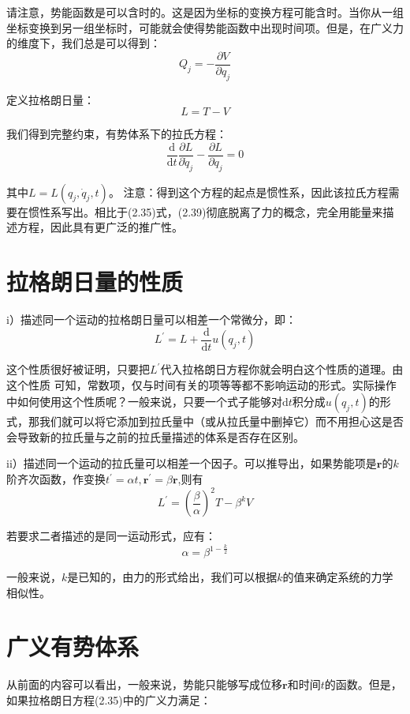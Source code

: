 \documentclass[a4paper, 10pt, openany]{book}%
\begin{document}
    请注意，势能函数是可以含时的。这是因为坐标的变换方程可能含时。当你从一组坐标变换到另一组坐标时，可能就会使得势能函数中出现时间项。但是，在广义力的维度下，我们总是可以得到：
    \begin{equation}Q_j=-\frac{\partial V}{\partial q_j}\end{equation}
    
    定义拉格朗日量：
    $$L=T-V$$
    
    我们得到完整约束，有势体系下的拉氏方程：
    \begin{equation}
      \frac{\mathrm{d}}{\mathrm{d}t}\frac{\partial L}{\partial \dot{q}_j}-\frac{\partial L}{\partial q_j}=0
    \end{equation}

    其中$L=L(q_j,\dot{q}_j,t)$。
    注意：得到这个方程的起点是惯性系，因此该拉氏方程需要在惯性系写出。相比于(2.35)式，(2.39)彻底脱离了力的概念，完全用能量来描述方程，因此具有更广泛的推广性。
    \section{拉格朗日量的性质}
    i）描述同一个运动的拉格朗日量可以相差一个常微分，即：
    \begin{equation}
      L^{\prime}=L+\frac{\mathrm{d}}{\mathrm{d}t}u(q_j,t)
    \end{equation}

    这个性质很好被证明，只要把$L^\prime$代入拉格朗日方程你就会明白这个性质的道理。由这个性质
    可知，常数项，仅与时间有关的项等等都不影响运动的形式。实际操作中如何使用这个性质呢？一般来说，只要一个式子能够对$\mathrm{d}t$积分成$u(q_j,t)$的形式，那我们就可以将它添加到拉氏量中（或从拉氏量中删掉它）而不用担心这是否会导致新的拉氏量与之前的拉氏量描述的体系是否存在区别。

    ii）描述同一个运动的拉氏量可以相差一个因子。可以推导出，如果势能项是$\textbf{r}$的$k$阶齐次函数，作变换$t^\prime=\alpha t, \textbf{r}^\prime=\beta\textbf{r}$,则有
    $$L^\prime=(\frac{\beta}{\alpha})^2T-\beta^kV$$
    
    若要求二者描述的是同一运动形式，应有：
    $$\alpha=\beta^{1-\frac{k}{2}}$$
    
    一般来说，$k$是已知的，由力的形式给出，我们可以根据$k$的值来确定系统的力学相似性。
    
    
    \section{广义有势体系}

    从前面的内容可以看出，一般来说，势能只能够写成位移$\textbf{r}$和时间$t$的函数。但是，如果拉格朗日方程(2.35)中的广义力满足：
    
\end{document}
